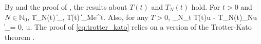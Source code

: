 By \cite[Lemma~4.3]{CGLW16} and the proof of \cite[Thm.~4.1]{CGLW16}, the results about \(T(t)\) and \(T_N(t)\) hold.
\bprop
For \(t>0\) and \(N\in\mathbb N_0\),
\be
    \| T_N(t) \|_\mcH , \| T(t) \|_\mcH \leq Me^{\omega t}.
\ee
Also, for any \(T>0\),
\be\label{eq:trotter_kato}
    \lim_{N\to\infty}\sup_{t\in[0,T]} \| T(t)u - T_N(t)\Pi_Nu \|_\mcH = 0, \quad \forall u\in\mcH.
\ee
\eprop
The proof of \cref{eq:trotter_kato} relies on a version of the Trotter-Kato theorem \cite[Thm.~4.5, p.~88]{P83}.